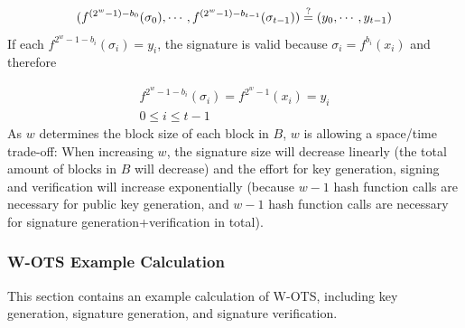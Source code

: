 \begin{equation}
(f^{(2^w-1)-b_0}(\sigma_0), \cdots, f^{(2^w - 1) - b_{t-1}}(\sigma_{t-1})) \stackrel{?}{=} (y_0, \cdots, y_{t-1})
\end{equation}
If each $f^{2^w-1-b_i}(\sigma_i) = y_i$, the signature is valid because $\sigma_i = f^{b_i}(x_i)$ and therefore

\begin{gather}
f^{2^w-1-b_i}(\sigma_i) = f^{2^w-1}(x_i) = y_i \\
0 \leq i \leq t-1 \nonumber
\end{gather}
As $w$ determines the block size of each block in $B$, $w$ is allowing a space/time trade-off: When increasing $w$, the signature size will decrease linearly (the total amount of blocks in $B$ will decrease) and the effort for key generation, signing and verification will increase exponentially (because $w-1$ hash function calls are necessary for public key generation, and $w-1$ hash function calls are necessary for signature generation+verification in total).

\subsubsection{W-OTS Example Calculation}
\label{sec:w-ots_example_calc}
This section contains an example calculation of W-OTS, including key generation, signature generation, and signature verification.

